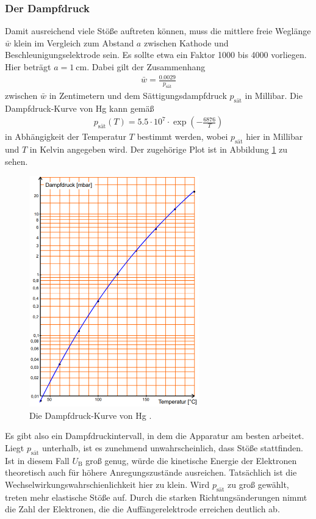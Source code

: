 \subsubsection{Der Dampfdruck}
\label{sec:dampfdruck}
Damit ausreichend viele Stöße auftreten können, muss die mittlere freie Weglänge $\bar{w}$ klein im Vergleich zum Abstand $a$ zwischen Kathode und Beschleunigungselektrode sein.
Es sollte etwa ein Faktor 1000 bis 4000 vorliegen.
Hier beträgt $a = \qty{1}{\cm}$.
Dabei gilt der Zusammenhang 
\begin{align}
    \bar{w} = \frac{0.0029}{p_\text{sät}}
\end{align} 
zwischen $\bar{w}$ in Zentimetern und dem Sättigungsdampfdruck $p_\text{sät}$ in Millibar.
Die Dampfdruck-Kurve von Hg kann gemäß 
\begin{align}
    p_\text{sät}(T) = \num{5.5} \cdot 10^7 \cdot \exp\left(-\frac{6876}{T}\right)
\end{align}
in Abhängigkeit der Temperatur $T$ bestimmt werden, wobei $p_\text{sät}$ hier in Millibar und $T$ in Kelvin angegeben wird.
Der zugehörige Plot ist in Abbildung \ref{fig:dampfdruck} zu sehen.

\begin{figure}[H]
    \centering
    \includegraphics[height = 10cm]{bilder/dampfdruck.png}
    \caption{Die Dampfdruck-Kurve von Hg \cite{man:v601}.}
    \label{fig:dampfdruck}
\end{figure}

\noindent
Es gibt also ein Dampfdruckintervall, in dem die Apparatur am besten arbeitet.
Liegt $p_\text{sät}$ unterhalb, ist es zunehmend unwahrscheinlich, dass Stöße stattfinden.
Ist in diesem Fall $U_\text{B}$ groß genug, würde die kinetische Energie der Elektronen theoretisch auch für höhere Anregungszustände ausreichen.
Tatsächlich ist die Wechselwirkungswahrschienlichkeit hier zu klein.
Wird $p_\text{sät}$ zu groß gewählt, treten mehr elastische Stöße auf.
Durch die starken Richtungsänderungen nimmt die Zahl der Elektronen, die die Auffängerelektrode erreichen deutlich ab.


